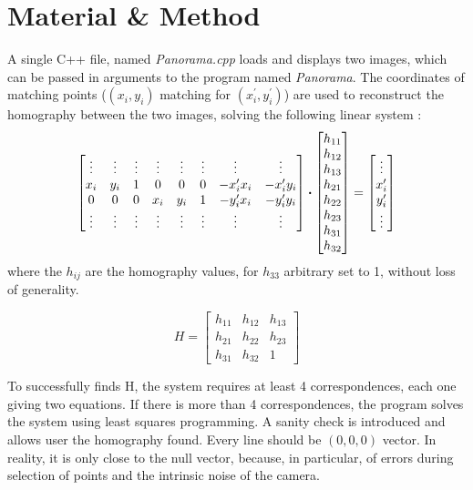 \documentclass[12pt,a4paper,onecolumn]{article}
\begin{document}
\section{Material \& Method}
A single C++ file, named \textit{Panorama.cpp} loads and displays two images, which can be passed in arguments to the program named \textit{Panorama}. The coordinates of matching points ($(x_i, y_i)$ matching for $(x_i^{\prime}, y_i^{\prime})$) are used to reconstruct the homography between the two images, solving the following linear system :
$$
\begin{bmatrix}
\vdots & \vdots & \vdots & \vdots & \vdots & \vdots & \vdots & \vdots\\
x_i & y_i & 1 & 0 & 0 & 0 & -x_i^{\prime}x_i & -x_i^{\prime}y_i\\
0 & 0 & 0 & x_i & y_i & 1 & -y_i^{\prime}x_i & -y_i^{\prime}y_i\\
\vdots & \vdots & \vdots & \vdots & \vdots & \vdots & \vdots & \vdots
\end{bmatrix}
\dotproduct
\begin{bmatrix}
h_{11}\\
h_{12}\\
h_{13}\\
h_{21}\\
h_{22}\\
h_{23}\\
h_{31}\\
h_{32}\\
\end{bmatrix}
=
\begin{bmatrix}
\vdots \\
x_i^{\prime}\\
y_i^{\prime}\\
\vdots
\end{bmatrix}
$$
where the $h_{ij}$ are the homography values, for $h_{33}$ arbitrary set to 1, without loss of generality.

$$ H =
\begin{bmatrix}
h_{11} & h_{12} & h_{13}\\
h_{21} & h_{22} & h_{23}\\
h_{31} & h_{32} & 1
\end{bmatrix}
$$

To successfully finds H, the system requires at least 4 correspondences, each one giving two equations. If there is more than 4 correspondences, the program solves the system using least squares programming.
A sanity check is introduced and allows user the homography found. Every line should be $(0, 0, 0)$ vector. In reality, it is only close to the null vector, because, in particular, of errors during selection of points and the intrinsic noise of the camera.
\end{document}
